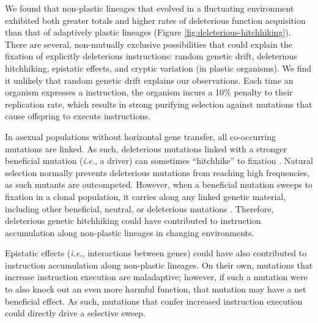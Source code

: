 \begin{raggedbottom}
We found that non-plastic lineages that evolved in a fluctuating environment exhibited both greater totals and higher rates of deleterious function acquisition than that of adaptively plastic lineages (Figure \ref{fig:deleterious-hitchhiking}).
There are several, non-mutually exclusive possibilities that could explain the fixation of explicitly deleterious instructions: random genetic drift, deleterious hitchhiking, epistatic effects, and cryptic variation (in plastic organisms).
We find it unlikely that random genetic drift explains our observations.
Each time an organism expresses a  instruction, the organism incurs a 10\% penalty to their replication rate, which results in strong purifying selection against mutations that cause offspring to execute  instructions.

In asexual populations without horizontal gene transfer, all co-occurring mutations are linked.
As such, deleterious mutations linked with a stronger beneficial mutation (\textit{i.e.}, a driver) can sometimes ``hitchhike'' to fixation \citep{smith_hitch-hiking_1974,van_den_bergh_experimental_2018,buskirk_hitchhiking_2017}.
Natural selection normally prevents deleterious mutations from reaching high frequencies, as such mutants are outcompeted.
However, when a beneficial mutation sweeps to fixation in a clonal population, it carries along any linked genetic material, including other beneficial, neutral, or deleterious mutations \citep{barton_genetic_2000, smith_hitch-hiking_1974}.
Therefore, deleterious genetic hitchhiking could have contributed to  instruction accumulation along non-plastic lineages in changing environments.

Epistatic effects (\textit{i.e.}, interactions between genes) could have also contributed to  instruction accumulation along non-plastic lineages. 
On their own, mutations that increase  instruction execution are maladaptive; however, if such a mutation were to also knock out an even more harmful function, that mutation may have a net beneficial effect.
As such, mutations that confer increased  instruction execution could directly drive a selective sweep. 


\end{raggedbottom}
